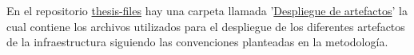 \newpage
{}\label{appendix:Archivos de despliegue}

En el repositorio \href{https://github.com/JoseDRojasA/thesis-files}{thesis-files} hay una carpeta llamada '\href{https://github.com/JoseDRojasA/thesis-files/tree/master/Despliegue de artefactos}{Despliegue de artefactos}' la cual contiene los archivos utilizados para el despliegue de los diferentes artefactos de la infraestructura siguiendo las convenciones planteadas en la metodolog\'ia.
